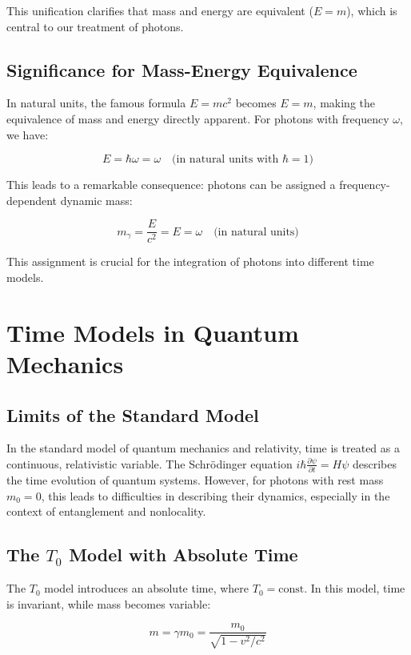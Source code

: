 \documentclass[a4paper,12pt]{article}
\begin{document}
	This unification clarifies that mass and energy are equivalent ($E = m$), which is central to our treatment of photons.
	
	\subsection{Significance for Mass-Energy Equivalence}
	In natural units, the famous formula $E = mc^2$ becomes $E = m$, making the equivalence of mass and energy directly apparent. For photons with frequency $\omega$, we have:
	
	\begin{equation}
		E = \hbar\omega = \omega \quad \text{(in natural units with $\hbar = 1$)}
	\end{equation}
	
	This leads to a remarkable consequence: photons can be assigned a frequency-dependent dynamic mass:
	
	\begin{equation}
		m_{\gamma} = \frac{E}{c^2} = E = \omega \quad \text{(in natural units)}
	\end{equation}
	
	This assignment is crucial for the integration of photons into different time models.
	
	\section{Time Models in Quantum Mechanics}
	\subsection{Limits of the Standard Model}
	In the standard model of quantum mechanics and relativity, time is treated as a continuous, relativistic variable. The Schrödinger equation $i\hbar\frac{\partial\psi}{\partial t} = H\psi$ describes the time evolution of quantum systems. However, for photons with rest mass $m_0 = 0$, this leads to difficulties in describing their dynamics, especially in the context of entanglement and nonlocality.
	
	\subsection{The $T_0$ Model with Absolute Time}
	The $T_0$ model introduces an absolute time, where $T_0 = \text{const.}$ In this model, time is invariant, while mass becomes variable:
	
	\begin{equation}
		m = \gamma m_0 = \frac{m_0}{\sqrt{1-v^2/c^2}}
	\end{equation}
	
\end{document}
